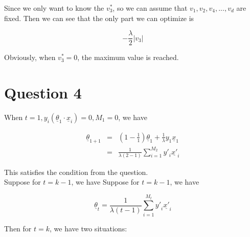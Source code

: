 \documentclass[12pt]{article}
\begin{document}
Since we only want to know the $v_3^*$, so we can assume that
$v_1, v_2, v_4,...,v_d$ are fixed. Then we can see that the only part
we can optimize is

\begin{equation*}
- \frac {\lambda}{2} |v_3|
\end{equation*}

Obviously, when $v^*_3 = 0$, the maximum value is reached. \\

\section*{Question 4}

When $t=1, y_i(\underline {\theta}_1 \cdot \underline {x}_i) = 0, M_1
= 0$, we have

\begin{eqnarray*}
\underline {\theta}_{1+1} &=& (1 - \frac {1}{1}) \underline {\theta}_1 +
\frac {1}{\lambda} y_1 \underline {x}_1\\
&=& \frac{1}{\lambda(2-1)} \sum_{i=1}^{M_2} {{y'}_i \underline {x'}_i}
\end{eqnarray*}

This satisfies the condition from the question.\\

Suppose for $t = k - 1$, we have
Suppose for $t = k - 1$, we have

\begin{equation*}
  \underline {\theta}_{t} = \frac {1}{\lambda (t-1)} \sum_{i=1}^{M_t}
  {{y'}_i \underline {x'}_i}
\end{equation*}

Then for $t = k$, we have two situations:
\end{document}
